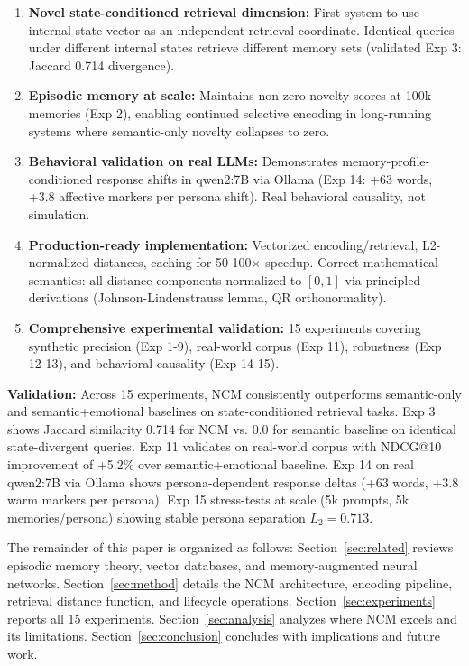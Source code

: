 \documentclass[10pt,twocolumn,letterpaper]{article}
\begin{document}
\begin{enumerate}
  \item \textbf{Novel state-conditioned retrieval dimension:} First system to use internal state vector as an independent retrieval coordinate. Identical queries under different internal states retrieve different memory sets (validated Exp 3: Jaccard 0.714 divergence).
  
  \item \textbf{Episodic memory at scale:} Maintains non-zero novelty scores at 100k memories (Exp 2), enabling continued selective encoding in long-running systems where semantic-only novelty collapses to zero.
  
  \item \textbf{Behavioral validation on real LLMs:} Demonstrates memory-profile-conditioned response shifts in qwen2:7B via Ollama (Exp 14: +63 words, +3.8 affective markers per persona shift). Real behavioral causality, not simulation.
  
  \item \textbf{Production-ready implementation:} Vectorized encoding/retrieval, L2-normalized distances, caching for 50-100$\times$ speedup. Correct mathematical semantics: all distance components normalized to $[0,1]$ via principled derivations (Johnson-Lindenstrauss lemma, QR orthonormality).
  
  \item \textbf{Comprehensive experimental validation:} 15 experiments covering synthetic precision (Exp 1-9), real-world corpus (Exp 11), robustness (Exp 12-13), and behavioral causality (Exp 14-15).
\end{enumerate}

\textbf{Validation:} Across 15 experiments, NCM consistently outperforms semantic-only and semantic+emotional baselines on state-conditioned retrieval tasks. Exp 3 shows Jaccard similarity 0.714 for NCM vs. 0.0 for semantic baseline on identical state-divergent queries. Exp 11 validates on real-world corpus with NDCG@10 improvement of +5.2\% over semantic+emotional baseline. Exp 14 on real qwen2:7B via Ollama shows persona-dependent response deltas (+63 words, +3.8 warm markers per persona). Exp 15 stress-tests at scale (5k prompts, 5k memories/persona) showing stable persona separation $L_2 = 0.713$.

The remainder of this paper is organized as follows: Section~\ref{sec:related} reviews episodic memory theory, vector databases, and memory-augmented neural networks. Section~\ref{sec:method} details the NCM architecture, encoding pipeline, retrieval distance function, and lifecycle operations. Section~\ref{sec:experiments} reports all 15 experiments. Section~\ref{sec:analysis} analyzes where NCM excels and its limitations. Section~\ref{sec:conclusion} concludes with implications and future work.
\end{document}
